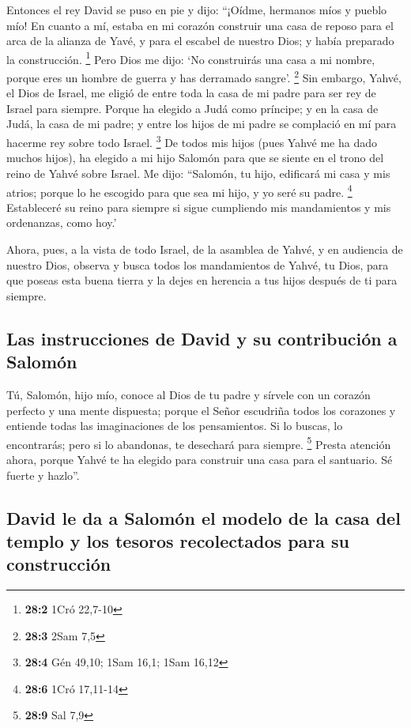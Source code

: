  Entonces el rey David se puso en pie y dijo: ``¡Oídme,
hermanos míos y pueblo mío! En cuanto a mí, estaba en mi corazón
construir una casa de reposo para el arca de la alianza de Yavé, y para
el escabel de nuestro Dios; y había preparado la construcción.
\footnote{\textbf{28:2} 1Cró 22,7-10}  Pero Dios me dijo:
`No construirás una casa a mi nombre, porque eres un hombre de guerra y
has derramado sangre'. \footnote{\textbf{28:3} 2Sam 7,5} 
Sin embargo, Yahvé, el Dios de Israel, me eligió de entre toda la casa
de mi padre para ser rey de Israel para siempre. Porque ha elegido a
Judá como príncipe; y en la casa de Judá, la casa de mi padre; y entre
los hijos de mi padre se complació en mí para hacerme rey sobre todo
Israel. \footnote{\textbf{28:4} Gén 49,10; 1Sam 16,1; 1Sam 16,12}
 De todos mis hijos (pues Yahvé me ha dado muchos hijos),
ha elegido a mi hijo Salomón para que se siente en el trono del reino de
Yahvé sobre Israel.  Me dijo: ``Salomón, tu hijo,
edificará mi casa y mis atrios; porque lo he escogido para que sea mi
hijo, y yo seré su padre. \footnote{\textbf{28:6} 1Cró 17,11-14}
 Estableceré su reino para siempre si sigue cumpliendo mis
mandamientos y mis ordenanzas, como hoy.'

 Ahora, pues, a la vista de todo Israel, de la asamblea de
Yahvé, y en audiencia de nuestro Dios, observa y busca todos los
mandamientos de Yahvé, tu Dios, para que poseas esta buena tierra y la
dejes en herencia a tus hijos después de ti para siempre.

\hypertarget{las-instrucciones-de-david-y-su-contribuciuxf3n-a-salomuxf3n}{%
\subsection{Las instrucciones de David y su contribución a
Salomón}\label{las-instrucciones-de-david-y-su-contribuciuxf3n-a-salomuxf3n}}

 Tú, Salomón, hijo mío, conoce al Dios de tu padre y
sírvele con un corazón perfecto y una mente dispuesta; porque el Señor
escudriña todos los corazones y entiende todas las imaginaciones de los
pensamientos. Si lo buscas, lo encontrarás; pero si lo abandonas, te
desechará para siempre. \footnote{\textbf{28:9} Sal 7,9} 
Presta atención ahora, porque Yahvé te ha elegido para construir una
casa para el santuario. Sé fuerte y hazlo''.

\hypertarget{david-le-da-a-salomuxf3n-el-modelo-de-la-casa-del-templo-y-los-tesoros-recolectados-para-su-construcciuxf3n}{%
\subsection{David le da a Salomón el modelo de la casa del templo y los
tesoros recolectados para su
construcción}\label{david-le-da-a-salomuxf3n-el-modelo-de-la-casa-del-templo-y-los-tesoros-recolectados-para-su-construcciuxf3n}}

